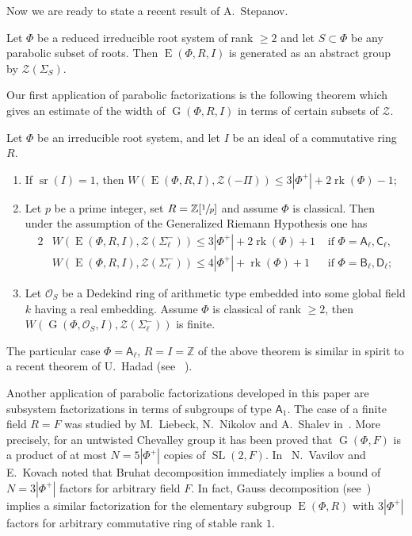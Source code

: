 \documentclass[12pt]{amsart}
\numberwithin{equation}{section}
\theoremstyle{definition}
\DeclareMathOperator{\G}{G}
\DeclareMathOperator{\SL}{SL}
\DeclareMathOperator{\E}{E}
\DeclareMathOperator{\sr}{sr}
\DeclareMathOperator{\rk}{rk}
\newcommand{\rA}{\mathsf{A}}
\newcommand{\rB}{\mathsf{B}}
\newcommand{\rC}{\mathsf{C}}
\newcommand{\rD}{\mathsf{D}}
\begin{document}
Now we are ready to state a recent result of A.~Stepanov.  
\begin{prop}[{\cite[Theorem~3.4]{S}}] \label{prop:Stepanov}
Let $\Phi$ be a reduced irreducible root system of rank $\geq 2$ and let $S \subset \Phi$ be any parabolic subset of roots.
Then $\E(\Phi, R, I)$ is generated as an abstract group by $\mathcal{Z}(\Sigma_S)$.
\end{prop}

Our first application of parabolic factorizations is the following theorem which gives an estimate of the width of $\G(\Phi, R, I)$ in terms of certain subsets of $\mathcal{Z}$.
\begin{thm}\label{thm:width} Let $\Phi$ be an irreducible root system, and let $I$ be an ideal of a commutative ring $R$.
\begin{enumerate}
\item If $\sr(I) = 1$, then $W(\E(\Phi,R,I),\mathcal{Z}(-\Pi))\leqslant 3|\Phi^+|+2\rk(\Phi)-1$;
\item Let $p$ be a prime integer, set $R = \mathbb{Z}[\sfrac{1}{p}]$ and assume $\Phi$ is classical. Then under the assumption of the Generalized Riemann Hypothesis one has
\begin{alignat*}{2}
& W(\E(\Phi,R,I), \mathcal{Z}(\Sigma_\ell^-))\leqslant 3|\Phi^+| + 2\rk(\Phi) + 1 & \text{ if } \Phi=\rA_\ell,\rC_\ell, \\
& W(\E(\Phi,R,I), \mathcal{Z}(\Sigma_\ell^-))\leqslant 4|\Phi^+| + \rk(\Phi) + 1 & \text{ if } \Phi=\rB_\ell,\rD_\ell;
\end{alignat*}
\item Let $\mathcal{O}_S$ be a Dedekind ring of arithmetic type embedded into some global field $k$ having a real embedding. 
Assume $\Phi$ is classical of rank $\geqslant2$, then $W(\G(\Phi,\mathcal{O}_S,I), \mathcal{Z}(\Sigma_\ell^-))$ is finite.
\end{enumerate}
\end{thm}
The particular case $\Phi = \rA_\ell$, $R = I = \mathbb{Z}$ of the above theorem is similar in spirit to a recent theorem of U.~Hadad (see ~\cite[Theorem~1.6]{Ha12}).

Another application of parabolic factorizations developed in this paper are subsystem factorizations in terms of subgroups of type $\rA_1$.
The case of a finite field $R=F$ was studied by M.~Liebeck, N.~Nikolov and A.~Shalev in~\cite{LiebNikShaSL2}.
More precisely, for an untwisted Chevalley group it has been proved that $\G(\Phi, F)$ is a product of at most $N=5|\Phi^+|$ copies of $\SL(2, F)$.
In~\cite{VavKovSL2} N.~Vavilov and E.~Kovach noted that Bruhat decomposition immediately implies a bound of $N=3|\Phi^+|$ factors for arbitrary field $F$.
In fact, Gauss decomposition (see~\cite{Sm12}) implies a similar factorization for the elementary subgroup $\E(\Phi, R)$ 
with $3|\Phi^+|$ factors for arbitrary commutative ring of stable rank $1$.
\end{document}
